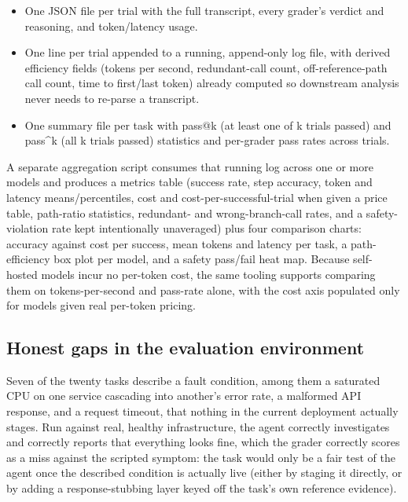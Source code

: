 \documentclass[11pt]{article}
\begin{document}
\begin{itemize}
  \item One JSON file per trial with the full transcript, every grader's
    verdict and reasoning, and token/latency usage.
  \item One line per trial appended to a running, append-only log file, with
    derived efficiency fields (tokens per second, redundant-call count,
    off-reference-path call count, time to first/last token) already
    computed so downstream analysis never needs to re-parse a transcript.
  \item One summary file per task with pass@k (at least one of k trials
    passed) and pass\textasciicircum k (all k trials passed) statistics and
    per-grader pass rates across trials.
\end{itemize}

A separate aggregation script consumes that running log across one or more
models and produces a metrics table (success rate, step accuracy, token and
latency means/percentiles, cost and cost-per-successful-trial when given a
price table, path-ratio statistics, redundant- and wrong-branch-call rates,
and a safety-violation rate kept intentionally unaveraged) plus four
comparison charts: accuracy against cost per success, mean tokens and
latency per task, a path-efficiency box plot per model, and a safety
pass/fail heat map. Because self-hosted models incur no per-token cost, the
same tooling supports comparing them on tokens-per-second and pass-rate
alone, with the cost axis populated only for models given real per-token
pricing.

\subsection{Honest gaps in the evaluation environment}
\label{sec:honest-gaps}

Seven of the twenty tasks describe a fault condition, among them a
saturated CPU on one service cascading into another's error rate, a
malformed API response, and a request timeout, that nothing in the current
deployment actually stages. Run against real, healthy infrastructure, the agent correctly
investigates and correctly reports that everything looks fine, which the
grader correctly scores as a miss against the scripted symptom: the task
would only be a fair test of the agent once the described condition is
actually live (either by staging it directly, or by adding a
response-stubbing layer keyed off the task's own reference evidence).
\end{document}
